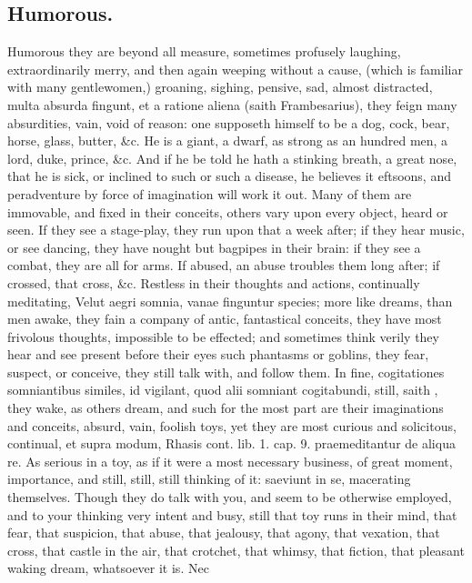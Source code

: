{\subsection{Humorous.}
Humorous they are beyond all measure, sometimes profusely
laughing, extraordinarily merry, and then again weeping without a
cause, (which is familiar with many gentlewomen,) groaning, sighing,
pensive, sad, almost distracted, multa absurda fingunt, et a ratione
aliena (saith Frambesarius), they feign many absurdities, vain,
void of reason: one supposeth himself to be a dog, cock, bear, horse,
glass, butter, \&c. He is a giant, a dwarf, as strong as an hundred men,
a lord, duke, prince, \&c. And if he be told he hath a stinking breath,
a great nose, that he is sick, or inclined to such or such a disease,
he believes it eftsoons, and peradventure by force of imagination will
work it out. Many of them are immovable, and fixed in their conceits,
others vary upon every object, heard or seen. If they see a stage-play,
they run upon that a week after; if they hear music, or see dancing,
they have nought but bagpipes in their brain: if they see a combat,
they are all for arms. If abused, an abuse troubles them long
after; if crossed, that cross, \&c. Restless in their thoughts and
actions, continually meditating, Velut aegri somnia, vanae finguntur
species; more like dreams, than men awake, they fain a company of
antic, fantastical conceits, they have most frivolous thoughts,
impossible to be effected; and sometimes think verily they hear and see
present before their eyes such phantasms or goblins, they fear,
suspect, or conceive, they still talk with, and follow them. In fine,
cogitationes somniantibus similes, id vigilant, quod alii somniant
cogitabundi, still, saith \Avicenna{}, they wake, as others dream, and
such for the most part are their imaginations and conceits,
absurd, vain, foolish toys, yet they are most curious and
solicitous, continual, et supra modum, Rhasis cont. lib. 1. cap. 9.
praemeditantur de aliqua re. As serious in a toy, as if it were a most
necessary business, of great moment, importance, and still, still,
still thinking of it: saeviunt in se, macerating themselves. Though
they do talk with you, and seem to be otherwise employed, and to your
thinking very intent and busy, still that toy runs in their mind, that
fear, that suspicion, that abuse, that jealousy, that agony, that
vexation, that cross, that castle in the air, that crotchet, that
whimsy, that fiction, that pleasant waking dream, whatsoever it is. Nec
}

